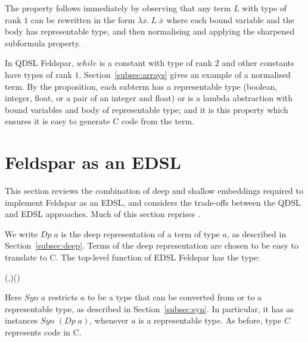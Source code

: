 \documentclass[authoryear,9pt]{sigplanconf}
\newcommand{\Conid}[1]{\mathit{#1}}
\newcommand{\Varid}[1]{\mathit{#1}}
\def\resethooks{%
  \global\let\SaveRestoreHook\empty
  \global\let\ColumnHook\empty}
\let\hspre\empty
\let\hspost\empty
\newcommand{\app}{\;}
\newcommand{\expabs}[3]{\lambda#1.\,#3}
\begin{document}
The property follows immediately by observing that any term $L$
with type of rank $1$ can be rewritten in the form
$\expabs{\overline{x}}{}{L \app \overline{x}}$ where each bound variable
and the body has representable type, and then normalising and applying
the sharpened subformula property.

In QDSL Feldspar, \ensuremath{\Varid{while}} is a constant with type of rank $2$ and
other constants have types of rank $1$.  Section~\ref{subsec:arrays}
gives an example of a normalised term.  By the proposition, each
subterm has a representable type (boolean, integer, float, or a pair of an
integer and float) or is a lambda abstraction with bound variables and
body of representable type; and it is this property which ensures it
is easy to generate C code from the term.

\section{Feldspar as an EDSL}
\label{sec:qdsl-vs-edsl}


This section reviews the combination of deep and shallow embeddings
required to implement Feldspar as an EDSL, and considers
the trade-offs between the QDSL and EDSL approaches.  Much of this
section reprises \citet{svenningsson:combining}.

We write \ensuremath{\Conid{Dp}\;\Varid{a}} is the deep representation of a term of type \ensuremath{\Varid{a}},
as described in Section~\ref{subsec:deep}. Terms of the deep
representation are chosen to be easy to translate to C.
The top-level function of EDSL Feldspar has the type:
\begin{hscode}\SaveRestoreHook
\column{B}{@{}>{\hspre}l<{\hspost}@{}}%
\column{E}{@{}>{\hspre}l<{\hspost}@{}}%
\>[B]{}\Varid{edsl}\mathbin{::}(\Conid{Syn}\;\Varid{a},\Conid{Syn}\;\Varid{b})\Rightarrow (\Varid{a}\to \Varid{b})\to \Conid{C}{}\<[E]%
\ColumnHook
\end{hscode}\resethooks
Here \ensuremath{\Conid{Syn}\;\Varid{a}} restricts \ensuremath{\Varid{a}} to be a type that can be converted from
or to a representable type, as described in Section~\ref{subsec:syn}.
In particular, it has as instances \ensuremath{\Conid{Syn}\;(\Conid{Dp}\;\Varid{a})}, whenever \ensuremath{\Varid{a}} is a
representable type. As before, type \ensuremath{\Conid{C}} represents code in C.

\end{document}
